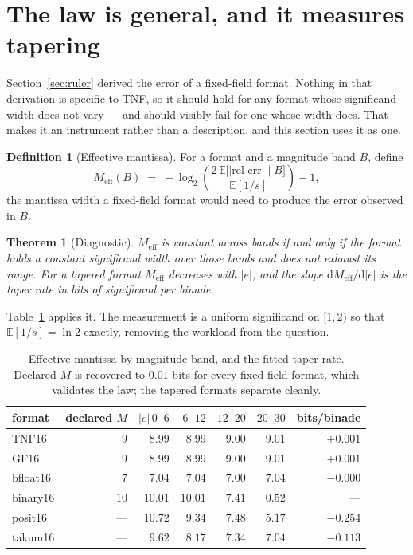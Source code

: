 \documentclass[11pt]{article}
\newtheorem{theorem}{Theorem}
\theoremstyle{definition}
\newtheorem{definition}{Definition}
\begin{document}
\section{The law is general, and it measures tapering}\label{sec:law}

Section~\ref{sec:ruler} derived the error of a fixed-field format. Nothing in that
derivation is specific to TNF, so it should hold for any format whose significand
width does not vary --- and should visibly fail for one whose width does. That
makes it an instrument rather than a description, and this section uses it as one.

\begin{definition}[Effective mantissa]
For a format and a magnitude band $B$, define
\[
  M_{\mathrm{eff}}(B) \;=\; -\log_2\!\left(\frac{2\,\mathbb{E}\bigl[|\text{rel err}|\;\big|\;B\bigr]}{\mathbb{E}[1/s]}\right) - 1 ,
\]
the mantissa width a fixed-field format would need to produce the error observed
in $B$.
\end{definition}

\begin{theorem}[Diagnostic]\label{thm:diag}
$M_{\mathrm{eff}}$ is constant across bands if and only if the format holds a
constant significand width over those bands and does not exhaust its range. For a
tapered format $M_{\mathrm{eff}}$ decreases with $|e|$, and the slope
$\mathrm{d}M_{\mathrm{eff}}/\mathrm{d}|e|$ is the taper rate in bits of
significand per binade.
\end{theorem}

Table~\ref{tab:meff} applies it. The measurement is a uniform significand on
$[1,2)$ so that $\mathbb{E}[1/s] = \ln 2$ exactly, removing the workload from the
question.

\begin{table}[t]\centering
\caption{Effective mantissa by magnitude band, and the fitted taper rate. Declared
$M$ is recovered to $0.01$ bits for every fixed-field format, which validates the
law; the tapered formats separate cleanly.}
\label{tab:meff}
\begin{tabular}{lrrrrrr}
\toprule
format & declared $M$ & $|e|\,0$--$6$ & $6$--$12$ & $12$--$20$ & $20$--$30$ & bits/binade \\
\midrule
TNF16   & $9$  & $8.99$  & $8.99$ & $9.00$ & $9.01$ & $+0.001$ \\
GF16     & $9$  & $8.99$  & $8.99$ & $9.00$ & $9.01$ & $+0.001$ \\
bfloat16 & $7$  & $7.04$  & $7.04$ & $7.00$ & $7.04$ & $-0.000$ \\
binary16 & $10$ & $10.01$ & $10.01$ & $7.41$ & $0.52$ & --- \\
posit16  & ---  & $10.72$ & $9.34$ & $7.48$ & $5.17$ & $\mathbf{-0.254}$ \\
takum16  & ---  & $9.62$  & $8.17$ & $7.34$ & $7.04$ & $\mathbf{-0.113}$ \\
\bottomrule
\end{tabular}
\end{table}
\end{document}
